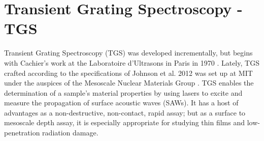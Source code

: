 

%




\section{Transient Grating Spectroscopy - TGS}
Transient Grating Spectroscopy (TGS) was developed incrementally, but begins with Cachier's work at the Laboratoire d'Ultrasons in Paris in 1970 \cite{Cachier2003}. Lately, TGS crafted according to the specifications of Johnson et al. 2012 \cite{Johnson2012} was set up at MIT under the auspices of the Mesoscale Nuclear Materials Group \cite{Cometto2018}. TGS enables the determination of a sample's material properties by using lasers to excite and measure the propagation of surface acoustic waves (SAWs). It has a host of advantages as a non-destructive, non-contact, rapid assay; but as a surface to mesoscale depth assay, it is especially appropriate for studying thin films and low-penetration radiation damage.

